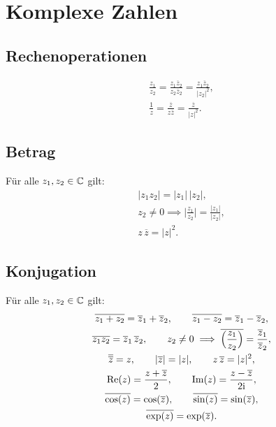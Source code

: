 \section{Komplexe Zahlen}
\subsection{Rechenoperationen}

\begin{gather}
\frac{z_1}{z_2}
= \frac{z_1\overline z_2}{z_2\overline z_2}
= \frac{z_1\overline z_2}{|z_2|^2},\\
\frac{1}{z} = \frac{\overline z}{z\overline z}
= \frac{\overline z}{|z|^2}.
\end{gather}

\subsection{Betrag}
Für alle $z_1,z_2\in\mathbb C$ gilt:
\begin{gather}
|z_1z_2| = |z_1|\,|z_2|,\\
z_2\ne 0\implies \Big|\frac{z_1}{z_2}\Big|
= \frac{|z_1|}{|z_2|},\\
z\,\overline z = |z|^2.
\end{gather}

\subsection{Konjugation}
Für alle $z_1,z_2\in\mathbb C$ gilt:
\begin{gather}
\overline{z_1+z_2} = \overline z_1+\overline z_2,\qquad
\overline{z_1-z_2} = \overline z_1-\overline z_2,\\
\overline{z_1 z_2} = \overline z_1\,\overline z_2,\qquad
z_2\ne 0 \implies \overline{\Big(\frac{z_1}{z_2}\Big)}
= \frac{\overline z_1}{\overline z_2},\\
\overline{\overline z}=z,\qquad
|\overline{z}| = |z|,\qquad
z\,\overline z = |z|^2,\\
\operatorname{Re}(z) = \frac{z+\overline z}{2},\qquad
\operatorname{Im}(z) = \frac{z-\overline z}{2\mathrm i},\\
\overline{\cos(z)} = \cos(\overline z),\qquad
\overline{\sin(z)} = \sin(\overline z),\\
\overline{\exp(z)} = \exp(\overline z).
\end{gather}

